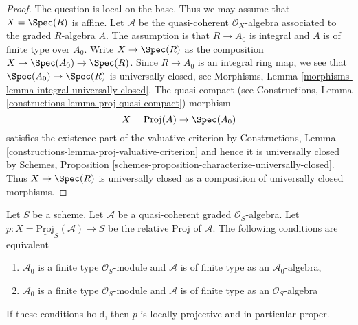 \begin{proof}
The question is local on the base. Thus we may assume that $X = \Spec(R)$
is affine. Let $\mathcal{A}$ be the quasi-coherent $\mathcal{O}_X$-algebra
associated to the graded $R$-algebra $A$. The assumption is that $R \to A_0$
is integral and $A$ is of finite type over $A_0$.
Write $X \to \Spec(R)$ as the composition $X \to \Spec(A_0) \to \Spec(R)$.
Since $R \to A_0$ is an integral ring map, we see that
$\Spec(A_0) \to \Spec(R)$ is universally closed, see
Morphisms, Lemma \ref{morphisms-lemma-integral-universally-closed}.
The quasi-compact (see
Constructions, Lemma \ref{constructions-lemma-proj-quasi-compact}) morphism
$$
X = \text{Proj}(A) \to \Spec(A_0)
$$
satisfies the existence part of the valuative criterion by
Constructions, Lemma \ref{constructions-lemma-proj-valuative-criterion}
and hence it is universally closed by
Schemes, Proposition \ref{schemes-proposition-characterize-universally-closed}.
Thus $X \to \Spec(R)$ is universally closed as a composition of
universally closed morphisms.
\end{proof}

\begin{lemma}
\label{lemma-relative-proj-proper}
Let $S$ be a scheme. Let $\mathcal{A}$ be a quasi-coherent graded
$\mathcal{O}_S$-algebra. Let
$p : X = \underline{\text{Proj}}_S(\mathcal{A}) \to S$ be the relative
Proj of $\mathcal{A}$. The following conditions are equivalent
\begin{enumerate}
\item $\mathcal{A}_0$ is a finite type $\mathcal{O}_S$-module
and $\mathcal{A}$ is of finite type as an $\mathcal{A}_0$-algebra,
\item $\mathcal{A}_0$ is a finite type $\mathcal{O}_S$-module
and $\mathcal{A}$ is of finite type as an $\mathcal{O}_S$-algebra
\end{enumerate}
If these conditions hold, then $p$ is locally projective and in
particular proper.
\end{lemma}

